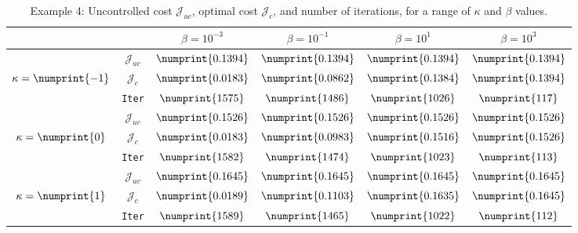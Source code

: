 \begin{table}
\begin{tabular}{ | c | c || c | c | c | c ||}
\hline
\multicolumn{2}{|c||}{}& $\beta = 10^{-3}$ & $\beta = 10^{-1}$ & $\beta = 10^{1}$ & $\beta = 10^{3}$  \\
\hline
\hline
 & $\mathcal{J}_{uc}$ & $\numprint{0.1394}$ & $\numprint{0.1394}$ & $\numprint{0.1394}$ & $\numprint{0.1394}$ \\
$\kappa= \numprint{-1}$  & $\mathcal{J}_c$ & $\numprint{0.0183}$ & $\numprint{0.0862}$ & $\numprint{0.1384}$ & $\numprint{0.1394}$ \\
& \texttt{Iter} & $\numprint{1575}$ & $\numprint{1486}$ & $\numprint{1026}$ & $\numprint{117}$ \\
\hline
 & $\mathcal{J}_{uc}$ & $\numprint{0.1526}$ & $\numprint{0.1526}$ & $\numprint{0.1526}$ & $\numprint{0.1526}$ \\
$\kappa= \numprint{0}$  & $\mathcal{J}_c$ & $\numprint{0.0183}$ & $\numprint{0.0983}$ & $\numprint{0.1516}$ & $\numprint{0.1526}$ \\
& \texttt{Iter} & $\numprint{1582}$ & $\numprint{1474}$ & $\numprint{1023}$ & $\numprint{113}$ \\
\hline
 & $\mathcal{J}_{uc}$ & $\numprint{0.1645}$ & $\numprint{0.1645}$ & $\numprint{0.1645}$ & $\numprint{0.1645}$ \\
$\kappa= \numprint{1}$  & $\mathcal{J}_c$ & $\numprint{0.0189}$ & $\numprint{0.1103}$ & $\numprint{0.1635}$ & $\numprint{0.1645}$ \\
& \texttt{Iter} & $\numprint{1589}$ & $\numprint{1465}$ & $\numprint{1022}$ & $\numprint{112}$ \\
\hline
\end{tabular}
\caption{Example 4: Uncontrolled cost $\mathcal{J}_{uc}$, optimal cost $\mathcal{J}_{c}$, and number of iterations, for a range of $\kappa$ and $\beta$ values.}
\label{TabS5:Prob4}
\end{table}